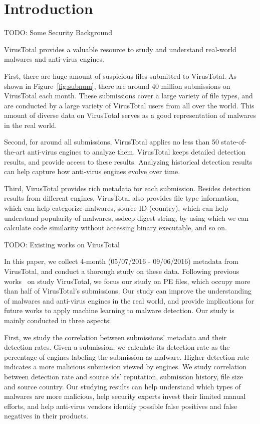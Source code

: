 \section{Introduction}
\label{sec:intro}



{\color{red} TODO: Some Security Background}



VirusTotal provides a valuable resource to study and 
understand real-world malwares and anti-virus engines. 

First, there are huge amount of suspicious files submitted to VirusTotal. 
As shown in Figure~\ref{fig:subnum}, 
there are around 40 million submissions on VirusTotal each month. 
These submissions cover a large variety of file types, and 
are conducted by a large variety of VirusTotal users from all over the world. 
This amount of diverse data on VirusTotal serves as a good representation of malwares in the real world.  

Second, for around all submissions, 
VirusTotal applies no less than 50 state-of-the-art anti-virus engines to analyze them. 
VirusTotal keeps detailed detection results, and provide access to these results. 
Analyzing historical detection results can help capture how anti-virus engines evolve over time. 

Third, VirusTotal provides rich metadata for each submission. 
Besides detection results from different engines, 
VirusTotal also provides file type information, which can help categorize malwares, 
source ID (country), which can help understand popularity of malwares, 
ssdeep digest string, by using which we can calculate code similarity without accessing binary executable, and so on. 


{\color{red} TODO: Existing works on VirusTotal}

In this paper, we collect 4-month (05/07/2016 - 09/06/2016) metadata from VirusTotal,
and conduct a thorough study on these data. 
Following previous works~\cite{SongAPsys2016} on study VirusTotal,
we focus our study on PE files, 
which occupy more than half of VirusTotal’s submissions.
Our study can improve the understanding of malwares and anti-virus engines in the real world, 
and provide implications for future works to apply machine learning to malware detection. 
Our study is mainly conducted in three aspects: 


First, we study the correlation between submissions’ metadata and their detection rates. 
Given a submission, 
we calculate its detection rate as the percentage of engines labeling the submission as malware. 
Higher detection rate indicates a more malicious submission viewed by engines.  
We study correlation between detection rate and source ids’ reputation, submission history, file size and source country. 
Our studying results can help understand which types of malwares are more malicious, 
help security experts invest their limited manual efforts, 
and help anti-virus vendors identify possible false positives and false negatives in their products.  


